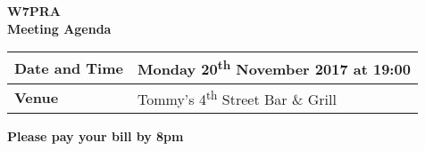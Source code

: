 \documentclass[letter,11pt]{extarticle}
\begin{document}
	\thispagestyle{empty}
	
	\begin{center}
		\textbf{W7PRA\\Meeting Agenda}
		\vspace{0.33cm}
	\end{center}
	
	\begin{center}
		\begin{tabular}{| m{3.0cm} | m{7.5cm} |} \hline
			\textbf{Date and Time} & Monday 20\textsuperscript{th} November 2017 at 19:00 \\ \hline
			\textbf{Venue} & Tommy's 4\textsuperscript{th} Street Bar \& Grill \\ \hline
				\end{tabular}
	\end{center}
	
	\begin{center}
		\textbf{Please pay your bill by 8pm}
	\end{center}
	
\end{document}
